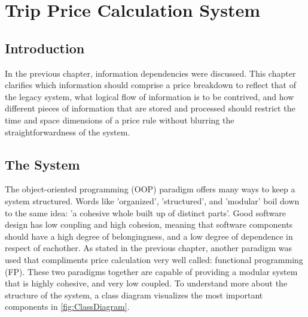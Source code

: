 \graphicspath{{Chapter4/Figs/Vector/}{Chapter4/Figs/}}

%
\chapter{Trip Price Calculation System}
\section{Introduction}
In the previous chapter, information dependencies were discussed. This chapter clarifies which information should comprise a price breakdown to reflect that of the legacy system, what logical flow of information is to be contrived, and how different pieces of information that are stored and processed should restrict the time and space dimensions of a price rule without blurring the straightforwardness of the system.

%
\section{The System}
The object-oriented programming (OOP) paradigm offers many ways to keep a system structured. Words like 'organized', 'structured', and 'modular' boil down to the same idea: 'a cohesive whole built up of distinct parts'. Good software design has low coupling and high cohesion, meaning that software components should have a high degree of belongingness, and a low degree of dependence in respect of eachother. As stated in the previous chapter, another paradigm was used that compliments price calculation very well called: functional programming (FP). These two paradigms together are capable of providing a modular system that is highly cohesive, and very low coupled. To understand more about the structure of the system, a class diagram visualizes the most important components in \ref{fig:ClassDiagram}.

